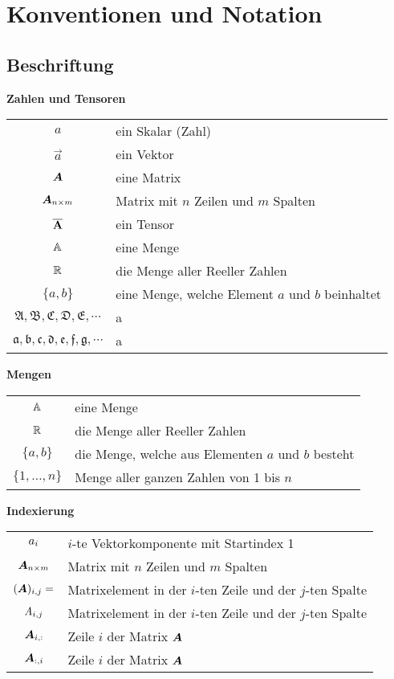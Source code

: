 \documentclass[../main]{subfiles}
\begin{document}
\section{Konventionen und Notation}

\subsection*{Beschriftung}

\begin{center}\textbf{Zahlen und Tensoren}\end{center}
\begin{tabular}{cl}
  $a$ & ein Skalar (Zahl) \\
  $\vec{a}$ & ein Vektor \\
  $\bm{A}$ & eine Matrix \\
  $\bm{A}_{n \times m}$ & Matrix mit $n$ Zeilen und $m$ Spalten \\
  $\overline{\mathbf{A}}$ & ein Tensor \\
  $\mathbb{A}$ & eine Menge \\
  $\mathbb{R}$ & die Menge aller Reeller Zahlen \\
  $\{a,b\}$ & eine Menge, welche Element $a$ und $b$ beinhaltet \\
  $\mathfrak{A,B,C,D,E,\cdots}$ & a \\
  $\mathfrak{a,b,c,d,e,f,g,\cdots}$ & a \\


\end{tabular}

\begin{center}\textbf{Mengen}\end{center}
\begin{tabular}{cl}
  $\mathbb{A}$ & eine Menge \\
  $\mathbb{R}$ & die Menge aller Reeller Zahlen \\
  $\{a,b\}$ & die Menge, welche aus Elementen $a$ und $b$ besteht \\
  $\{1,\ldots,n\}$ & Menge aller ganzen Zahlen von 1 bis $n$ \\

\end{tabular}

\begin{center}\textbf{Indexierung}\end{center}
\begin{tabular}{cl}
  $a_i$ & $i$-te Vektorkomponente mit Startindex 1 \\
  $\bm{A}_{n \times m}$ & Matrix mit $n$ Zeilen und $m$ Spalten \\
  $(\bm{A})_{i,j} = $ & Matrixelement in der $i$-ten Zeile und der $j$-ten Spalte \\
  $\mathit{A}_{i,j}$ & Matrixelement in der $i$-ten Zeile und der $j$-ten Spalte \\
  $\bm{A}_{i,:}$ & Zeile $i$ der Matrix $\bm{A}$ \\
  $\bm{A}_{:,i}$ & Zeile $i$ der Matrix $\bm{A}$\ \\

\end{tabular}
\end{document}
